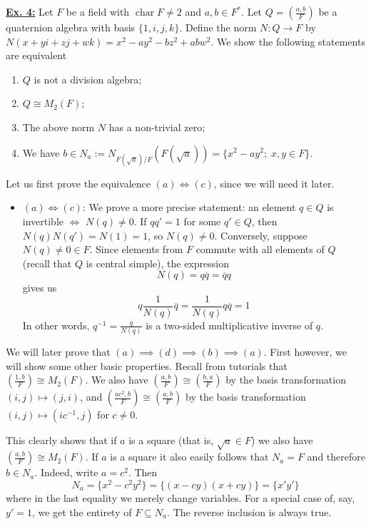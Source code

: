 \documentclass[a4paper, 12pt]{article}
\DeclareMathOperator{\chrs}{char}
\newcommand{\iso}{\cong}
\begin{document}
\underline{\textbf{Ex. 4:}}
Let $F$ be a field with $\chrs F \neq 2$ and $a, b \in F^*$. Let $Q = \left(\frac{a, b}{F}\right)$ be a quaternion algebra with basis $\lbrace 1, i, j, k \rbrace$. Define the norm $N \colon Q \to F$ by $N(x + yi + zj + wk) = x^2 - ay^2 - bz^2 + abw^2$. We show the following statements are equivalent
\begin{enumerate}[label=(\alph*)]
	\item $Q$ is not a division algebra;
	\item $Q \iso M_2(F)$;
	\item The above norm $N$ has a non-trivial zero;
	\item We have $b \in N_a := N_{F(\sqrt{a})/F}(F(\sqrt{a})) = \lbrace x^2 - ay^2 ; \; x, y \in F \rbrace$.
\end{enumerate}
Let us first prove the equivalence $(a) \iff (c)$, since we will need it later.
\begin{itemize}
	\item \underline{$(a) \iff (c)$}: We prove a more precise statement: an element $q \in Q$ is invertible $\iff$ $N(q) \neq 0$. If $qq' = 1$ for some $q' \in Q$, then $N(q)N(q') = N(1) = 1$, so $N(q) \neq 0$. Conversely, suppose $N(q) \neq 0 \in F$. Since elements from $F$ commute with all elements of $Q$ (recall that $Q$ is central simple), the expression
	\[
	N(q) = q\overline{q} = \overline{q}q
	\]
	gives us
	\[
	q\frac{1}{N(q)}\overline{q} = \frac{1}{N(q)}q\overline{q} = 1
	\]
	In other words, $q^{-1} = \frac{\overline{q}}{N(q)}$ is a two-sided multiplicative inverse of $q$.
\end{itemize}

We will later prove that $(a) \implies (d) \implies (b) \implies (a)$. First however, we will show some other basic properties. Recall from tutorials that $\left(\frac{1,b}{F}\right) \iso M_2(F)$. We also have $\left(\frac{a, b}{F}\right) \iso \left(\frac{b, a}{F}\right)$ by the basis transformation $(i, j) \mapsto (j, i)$, and $\left(\frac{ac^2, b}{F}\right) \iso \left(\frac{a, b}{F}\right)$ by the basis transformation $(i, j) \mapsto (ic^{-1}, j)$ for $c \neq 0$.

This clearly shows that if $a$ is a square (that is, $\sqrt{a} \in F$) we also have $\left(\frac{a, b}{F}\right) \iso M_2(F)$. If $a$ is a square it also easily follows that $N_a = F$ and therefore $b \in N_a$. Indeed, write $a = c^2$. Then
\[
N_a = \lbrace x^2 - c^2 y^2 \rbrace = \lbrace (x-cy)(x+cy) \rbrace = \lbrace x'y' \rbrace
\]
where in the last equality we merely change variables. For a special case of, say, $y' = 1$, we get the entirety of $F \subseteq N_a$. The reverse inclusion is always true.
\end{document}
